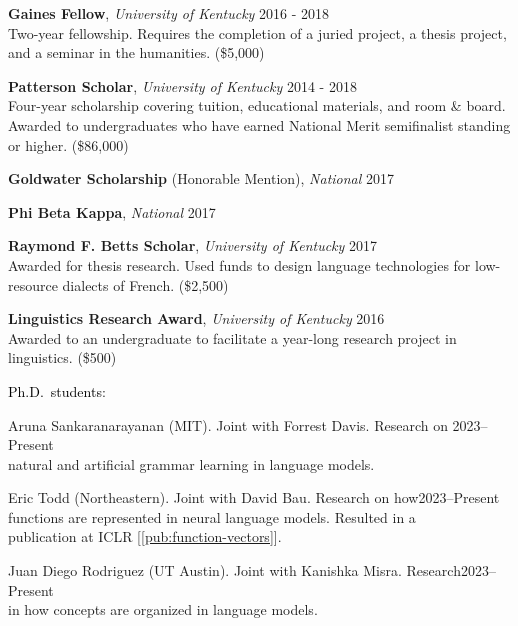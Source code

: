 \documentclass[10pt]{article}
\renewcommand{\section}[1]{\pagebreak[3]%
	\vspace{0.5\baselineskip}%
	\phantomsection\addcontentsline{toc}{section}{#1}%
	\noindent\llap{\bf\scshape\smash{\parbox[t]{\marginparwidth}{\hyphenpenalty=10000\raggedright \textcolor{black}{#1}}}}%
	\vspace{-\baselineskip}\par}
\renewcommand{\subsection}[1]{\textcolor{black}{#1}}
\newcommand{\halfblankline}{\quad\vspace{-0.5\baselineskip}\pagebreak[3]}
\begin{document}
	\halfblankline
	
	\textbf{Gaines Fellow}, \textit{University of Kentucky}
	\hfill 2016 - 2018\\
		Two-year fellowship. Requires the completion of a juried project, a thesis project, and a seminar in the humanities. (\$5,000)
	
	\halfblankline

	\textbf{Patterson Scholar}, \textit{University of Kentucky}
	\hfill 2014 - 2018\\
		Four-year scholarship covering tuition, educational materials, and room \& board. Awarded to undergraduates who have earned National Merit semifinalist standing or higher. (\$86,000)

	\halfblankline

	\textbf{Goldwater Scholarship} (Honorable Mention), \textit{National}
	\hfill 2017
	
	\halfblankline
	
	\textbf{Phi Beta Kappa}, \textit{National}
	\hfill 2017

	\halfblankline
	
	\textbf{Raymond F. Betts Scholar}, \textit{University of Kentucky}
	\hfill 2017\\
		Awarded for thesis research. Used funds to design language technologies for low-resource
		dialects of French. (\$2,500)

	\halfblankline

	\textbf{Linguistics Research Award}, \textit{University of Kentucky}
	\hfill 2016\\
		Awarded to an undergraduate to facilitate a year-long
		research project in linguistics. (\$500)

	

	\section{Mentoring}
	\subsection{Ph.D.\ students}:
	\begin{innerlist}
	\item Aruna Sankaranarayanan (MIT). Joint with Forrest Davis. Research on \hfill 2023--Present\\
		natural and artificial grammar learning in language models.
	\item Eric Todd (Northeastern). Joint with David Bau. Research on how\hfill 2023--Present\\functions are
		represented in neural language models. Resulted in a\\publication at ICLR [\ref{pub:function-vectors}].
	\item Juan Diego Rodriguez (UT Austin). Joint with Kanishka Misra. Research\hfill 2023--Present\\
		  in how concepts are organized in language models.
	\end{innerlist}
\end{document}
